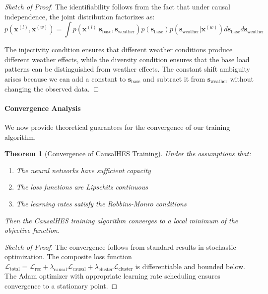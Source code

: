 \documentclass[journal]{IEEEtran}
\newtheorem{theorem}{Theorem}
\begin{document}
\begin{proof}[Sketch of Proof]
The identifiability follows from the fact that under causal independence, the joint distribution factorizes as:
\begin{equation}
p(\mathbf{x}^{(l)}, \mathbf{x}^{(w)}) = \int p(\mathbf{x}^{(l)} | \mathbf{s}_{\text{base}}, \mathbf{s}_{\text{weather}}) p(\mathbf{s}_{\text{base}}) p(\mathbf{s}_{\text{weather}} | \mathbf{x}^{(w)}) d\mathbf{s}_{\text{base}} d\mathbf{s}_{\text{weather}}
\end{equation}

The injectivity condition ensures that different weather conditions produce different weather effects, while the diversity condition ensures that the base load patterns can be distinguished from weather effects. The constant shift ambiguity arises because we can add a constant to $\mathbf{s}_{\text{base}}$ and subtract it from $\mathbf{s}_{\text{weather}}$ without changing the observed data.
\end{proof}

\paragraph{Convergence Analysis}
We now provide theoretical guarantees for the convergence of our training algorithm.

\begin{theorem}[Convergence of CausalHES Training]
Under the assumptions that:
\begin{enumerate}
    \item The neural networks have sufficient capacity
    \item The loss functions are Lipschitz continuous
    \item The learning rates satisfy the Robbins-Monro conditions
\end{enumerate}
Then the CausalHES training algorithm converges to a local minimum of the objective function.
\end{theorem}

\begin{proof}[Sketch of Proof]
The convergence follows from standard results in stochastic optimization. The composite loss function $\mathcal{L}_{\text{total}} = \mathcal{L}_{\text{rec}} + \lambda_{\text{causal}}\mathcal{L}_{\text{causal}} + \lambda_{\text{cluster}}\mathcal{L}_{\text{cluster}}$ is differentiable and bounded below. The Adam optimizer with appropriate learning rate scheduling ensures convergence to a stationary point.
\end{proof}
\end{document}
